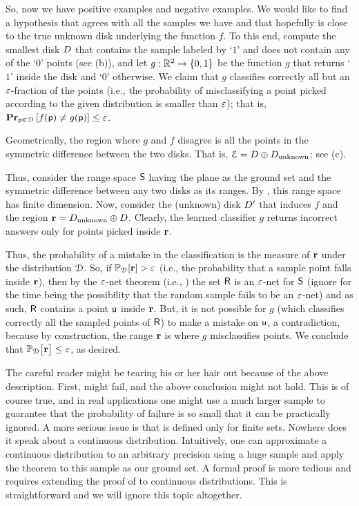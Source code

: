 So, now we have positive examples and negative examples. We would like
to find a hypothesis that agrees with all the samples we have and that
hopefully is close to the true unknown disk underlying the function
$f$. To this end, compute the smallest disk $D$ that contains the
sample labeled by `$1$' and does not contain any of the `$0$' points
(see  (b)),
and let $g:\mathbb{R}^2 \rightarrow \left\{ {0,1} \right\}$ be the function $g$ that
returns `$1$' inside the disk and `$0$' otherwise.  We claim that $g$
classifies correctly all but an ${\varepsilon}$-fraction of the points (i.e.,
the probability of misclassifying a point picked according to the
given distribution is smaller than ${\varepsilon}$); that is, $\mathop{\mathbf{Pr}}_{\mathsf{p}
   \in \EuScript{D}}\left[ {f(\mathsf{p}) \ne g(\mathsf{p})} \right] \leq {\varepsilon}$.

Geometrically, the region where $g$ and $f$ disagree is all the points
in the symmetric difference between the two disks. That is, $\EuScript{E} =
D \oplus D_{\text{unknown}}$; see  (c).

Thus, consider the range space $\mathsf{S}$ having the plane as the
ground set and the symmetric difference between any two disks as its
ranges. By , this range space has finite \VC{}
dimension. Now, consider the (unknown) disk $D'$ that induces $f$
and the region $\mathbf{r} = D_\text{unknown} \oplus D$. Clearly,
the learned classifier $g$ returns incorrect answers only for points
picked inside $\mathbf{r}$.

Thus, the probability of a mistake in the classification is the
measure of $\mathbf{r}$ under the distribution $\EuScript{D}$. So, if
$\mathbb{P}_{\EuScript{D}} [ \mathbf{r} ] > {\varepsilon}$ (i.e., the probability that
a sample point falls inside $\mathbf{r}$), then by the ${\varepsilon}$-net theorem
(i.e., ) the set $\mathsf{R}$ is an ${\varepsilon}$-net for
$\mathsf{S}$ (ignore for the time being the possibility that the
random sample  fails to be an ${\varepsilon}$-net) and as
such, $\mathsf{R}$ contains a point $\mathsf{u}$ inside $\mathbf{r}$. But, it is
not possible for $g$ (which classifies correctly all the sampled
points of $\mathsf{R}$) to make a mistake on $\mathsf{u}$, a contradiction,
because by construction, the range $\mathbf{r}$ is where $g$ misclassifies
points. We conclude that
$\mathbb{P}_{\EuScript{D}}\, \!\!\left[ { \mathbf{r} } \bigr. \right] \leq {\varepsilon}$, as desired.

  The careful reader might be tearing his or
her hair out because of the above description. First,
 might fail, and the above conclusion might not
hold. This is of course true, and in real applications one might use a
much larger sample to guarantee that the probability of failure is so
small that it can be practically ignored.  A more serious issue is
that  is defined only for finite sets. Nowhere
does it speak about a continuous distribution.  Intuitively, one can
approximate a continuous distribution to an arbitrary precision using
a huge sample and apply the theorem to this sample as our ground
set. A formal proof is more tedious and requires extending the proof
of  to continuous distributions. This is
straightforward and we will ignore this topic altogether.


